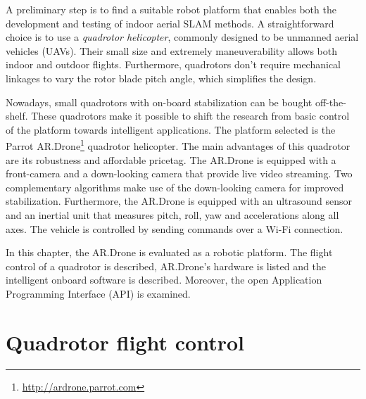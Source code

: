 A preliminary step is to find a suitable robot platform that enables both the development and testing of indoor aerial SLAM methods.
A straightforward choice is to use a \textit{quadrotor helicopter}, commonly designed to be unmanned aerial vehicles (UAVs).
Their small size and extremely maneuverability allows both indoor and outdoor flights.
Furthermore, quadrotors don't require mechanical linkages to vary the rotor blade pitch angle, which simplifies the design.

Nowadays, small quadrotors with on-board stabilization can be bought off-the-shelf.
These quadrotors make it possible to shift the research from basic control of the platform towards intelligent applications.
The platform selected is the Parrot AR.Drone\footnote{\url{http://ardrone.parrot.com}} quadrotor helicopter.
The main advantages of this quadrotor are its robustness and affordable pricetag.
The AR.Drone is equipped with a front-camera and a down-looking camera that provide live video streaming.
Two complementary algorithms make use of the down-looking camera for improved stabilization.
Furthermore, the AR.Drone is equipped with an ultrasound sensor and an inertial unit that measures pitch, roll, yaw and accelerations along all axes.
The vehicle is controlled by sending commands over a Wi-Fi connection.

In this chapter, the AR.Drone is evaluated as a robotic platform.
The flight control of a quadrotor is described, AR.Drone's hardware is listed and the intelligent onboard software is described.
Moreover, the open Application Programming Interface (API) is examined.


\section{Quadrotor flight control}
\label{sec:platform-quadrotor-flight-control}

